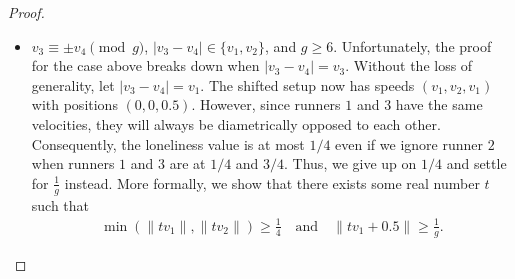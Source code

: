 \documentclass[11pt]{amsart}
\newcommand{\norm}[1]{\lVert #1 \rVert}
\newcommand{\Norm}[1]{\left\lVert #1 \right\rVert}
\begin{document}
\begin{proof}
\begin{itemize}
        In other words, we need to find some time $t$ such that
        $$\Norm{t\left(v_3 - v_4\right)} \leq \frac{1}{2} - \frac{1}{g},$$
        which means that both runners $3$ and $4$ are $\norm{t(v_3 - v_4)}$ apart but are both still in the valid region. Note the usage of the less than or equal sign, as opposed to the usual greater than or equal sign. We can convert it to the familiar form by shifting by $0.5$
        $$\Norm{t\left(v_3 - v_4\right) + 0.5} \geq \frac{1}{2} - \left(\frac{1}{2} - \frac{1}{g}\right) = \frac{1}{g}.$$
        Since $|v_3 - v_4| \neq v_1$ or $v_2$, we can use theorem \ref{the2}, the theorem for three Shifted Lonely Runner for $3$ moving runners with speeds $(v_1,v_2,|v_3 - v_4|)$ and starting positions are $(0,0,0.5)$. This gives us a time $t$ such that runners $1$ and $2$ are at least $\frac{1}{4}$ away from the origin, and runners $3$ and $4$ are at most $\frac{1}{4}$ apart, which is less than or equal to $\frac{1}{2} - \frac{1}{g}$ as desired. 
        
        \item $v_3 \equiv \pm v_4 \pmod g$, $|v_3 - v_4| \in \{v_1, v_2\}$, and $g \geq 6$. Unfortunately, the proof for the case above breaks down when $|v_3 - v_4| = v_3$. Without the loss of generality, let $|v_3 - v_4| = v_1$. The shifted setup now has speeds $(v_1, v_2, v_1)$ with positions $(0, 0, 0.5)$. However, since runners $1$ and $3$ have the same velocities, they will always be diametrically opposed to each other. Consequently, the loneliness value is at most $1/4$ even if we ignore runner $2$ when runners $1$ and $3$ are at $1/4$ and $3/4$. Thus, we give up on $1/4$ and settle for $\frac{1}{g}$ instead. More formally, we show that there exists some real number $t$ such that
        \begin{align*}\min(\norm{tv_1},\norm{tv_2}) \geq \frac{1}{4} \quad \text{and} \quad \norm{tv_1 + 0.5} \geq \frac{1}{g}.\end{align*}
        

\end{itemize}
\end{proof}
\end{document}
